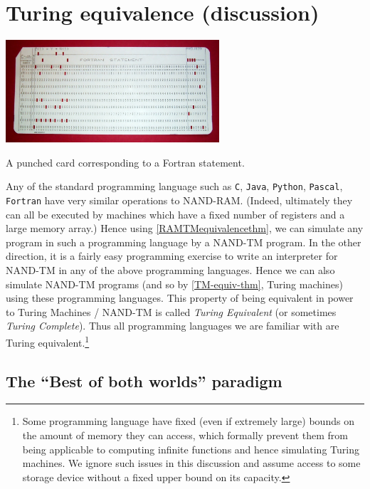 \section{Turing equivalence
(discussion)}\label{Turing-equivalence-discus}


\begin{marginfigure}
\centering
\includegraphics[width=\linewidth, height=1.5in, keepaspectratio]{../figure/FortranProg.jpg}
\caption{A punched card corresponding to a Fortran statement.}
\label{fortranfig}
\end{marginfigure}

Any of the standard programming language such as \texttt{C},
\texttt{Java}, \texttt{Python}, \texttt{Pascal}, \texttt{Fortran} have
very similar operations to NAND-RAM. (Indeed, ultimately they can all be
executed by machines which have a fixed number of registers and a large
memory array.) Hence using \cref{RAMTMequivalencethm}, we can simulate
any program in such a programming language by a NAND-TM program. In the
other direction, it is a fairly easy programming exercise to write an
interpreter for NAND-TM in any of the above programming languages. Hence
we can also simulate NAND-TM programs (and so by \cref{TM-equiv-thm},
Turing machines) using these programming languages. This property of
being equivalent in power to Turing Machines / NAND-TM is called
\emph{Turing Equivalent} (or sometimes \emph{Turing Complete}). Thus all
programming languages we are familiar with are Turing
equivalent.\footnote{Some programming language have fixed (even if
  extremely large) bounds on the amount of memory they can access, which
  formally prevent them from being applicable to computing infinite
  functions and hence simulating Turing machines. We ignore such issues
  in this discussion and assume access to some storage device without a
  fixed upper bound on its capacity.}

\subsection{The ``Best of both worlds''
paradigm}\label{The-Best-of-both-worlds-p}

